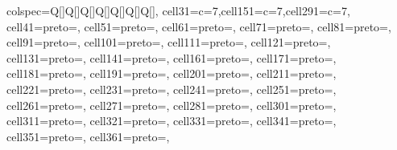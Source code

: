 \begin{tblr}[         %
]                     %
{                     %
colspec={Q[]Q[]Q[]Q[]Q[]Q[]Q[]},
cell{3}{1}={c=7}{},cell{15}{1}={c=7}{},cell{29}{1}={c=7}{},
cell{4}{1}={preto={\hspace{1em}}},
cell{5}{1}={preto={\hspace{1em}}},
cell{6}{1}={preto={\hspace{1em}}},
cell{7}{1}={preto={\hspace{1em}}},
cell{8}{1}={preto={\hspace{1em}}},
cell{9}{1}={preto={\hspace{1em}}},
cell{10}{1}={preto={\hspace{1em}}},
cell{11}{1}={preto={\hspace{1em}}},
cell{12}{1}={preto={\hspace{1em}}},
cell{13}{1}={preto={\hspace{1em}}},
cell{14}{1}={preto={\hspace{1em}}},
cell{16}{1}={preto={\hspace{1em}}},
cell{17}{1}={preto={\hspace{1em}}},
cell{18}{1}={preto={\hspace{1em}}},
cell{19}{1}={preto={\hspace{1em}}},
cell{20}{1}={preto={\hspace{1em}}},
cell{21}{1}={preto={\hspace{1em}}},
cell{22}{1}={preto={\hspace{1em}}},
cell{23}{1}={preto={\hspace{1em}}},
cell{24}{1}={preto={\hspace{1em}}},
cell{25}{1}={preto={\hspace{1em}}},
cell{26}{1}={preto={\hspace{1em}}},
cell{27}{1}={preto={\hspace{1em}}},
cell{28}{1}={preto={\hspace{1em}}},
cell{30}{1}={preto={\hspace{1em}}},
cell{31}{1}={preto={\hspace{1em}}},
cell{32}{1}={preto={\hspace{1em}}},
cell{33}{1}={preto={\hspace{1em}}},
cell{34}{1}={preto={\hspace{1em}}},
cell{35}{1}={preto={\hspace{1em}}},
cell{36}{1}={preto={\hspace{1em}}},
}
\end{tblr}

